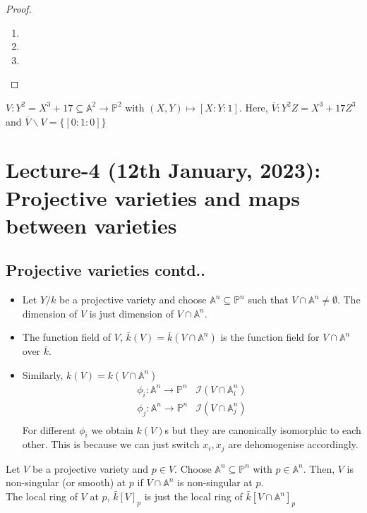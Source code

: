 \documentclass[oneside, 12pt]{scrbook}
\newcommand{\I}{\mathcal{I}}
\newcommand{\Aa}{\mathbb{A}}
\newcommand{\PP}{\mathbb{P}}
\theoremstyle{theorem}
\begin{document}
\begin{proof}
\begin{enumerate}
\item 

\item

\item
\end{enumerate}
\end{proof}

\begin{example}
$V : Y^2 = X^3 + 17 \subseteq \mathbb{A}^2 \rightarrow \mathbb{P}^2$ with $(X,Y) \mapsto [X: Y: 1]$. Here, $\overline{V} : Y^2Z =X^3 +17Z^3$ and $\overline{V} \backslash V = \{[0:1:0]\}$
\end{example}

\chapter{Lecture-4 (12th January, 2023): Projective varieties and maps between varieties}

\section{Projective varieties contd..}

\begin{definition}
\begin{itemize}
\item Let $Y / k$ be a projective variety and choose $\Aa^n \subseteq \PP^n$ such that $V \cap \Aa^n \neq \emptyset$. The dimension of $V$ is just dimension of $V \cap \Aa^n$.
\item The function field of $V$, $\bar{k}(V) = \bar{k}(V \cap \Aa^n)$ is the function field for $V \cap \Aa^n$ over $\bar{k}$.
\item Similarly, $k(V) = k(V \cap \Aa^n)$
\begin{align*}
\phi_{i}: \Aa^n \rightarrow \PP^n &\I(V \cap \Aa_{i}^n) \\
\phi_{j}: \Aa^n \rightarrow \PP^n &\I(V \cap \Aa_{j}^n) \\ 
\end{align*}
For different $\phi_{i}$ we obtain $k(V)$s but they are canonically isomorphic to each other. This is because we can just switch $x_{i},x_{j}$ are dehomogenise accordingly. 
\end{itemize}
\end{definition}

\begin{definition}
Let $V$ be a projective variety and $p \in V$. Choose $\Aa^n \subseteq \PP^n$ with $p \in \Aa^n$. Then, $V$ is non-singular (or smooth) at $p$ if $V\cap \Aa^n$ is non-singular at $p$. \\

The local ring of $V$ at $p$, $\bar{k}[V]_{p}$ is just the local ring of $\bar{k}[V \cap \Aa^n]_{p}$
\end{definition}
\end{document}
